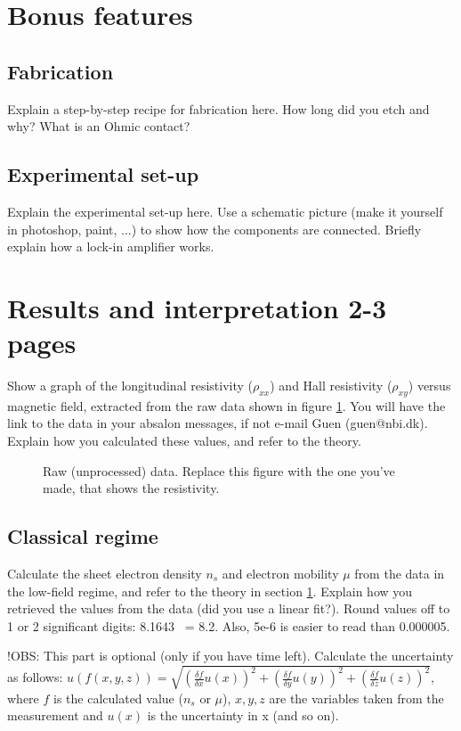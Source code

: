 \documentclass[a4paper]{article}
\begin{document}
      \section{Bonus features}
      \label{sec:bonus}
      \subsection{Fabrication}
      Explain a step-by-step recipe for fabrication here. How long did you etch and why? What is an Ohmic contact?
      \subsection{Experimental set-up}
      Explain the experimental set-up here. Use a schematic picture (make it yourself in photoshop, paint, ...) to show how the components are connected. Briefly explain how a lock-in amplifier works.
      
      \newpage
      \section{Results and interpretation 2-3 pages}
      Show a graph of the longitudinal resistivity ($\rho_{xx}$) and Hall resistivity ($\rho_{xy}$) versus magnetic field, extracted from the raw data shown in figure \ref{fig:data}. You will have the link to the data in your absalon messages, if not e-mail Guen (guen@nbi.dk). Explain how you calculated these values, and refer to the theory.
      
      \begin{figure}
      \centering
      \caption{\label{fig:data}Raw (unprocessed) data. Replace this figure with the one you've made, that shows the resistivity.}
      \end{figure}
      
      \subsection{Classical regime}
      Calculate the sheet electron density $n_{s}$ and electron mobility $\mu$ from the data in the low-field regime, and refer to the theory in section \ref{sec:bonus}. Explain how you retrieved the values from the data (did you use a linear fit?).
      Round values off to 1 or 2 significant digits: 8.1643 ~= 8.2. Also, 5e-6 is easier to read than 0.000005.
      
      !OBS: This part is optional (only if you have time left).
      Calculate the uncertainty as follows: \newline $u(f(x, y, z)) = \sqrt{(\frac{\delta f}{\delta{x}} u(x))^{2} + (\frac{\delta f}{\delta{y}} u(y))^{2} + (\frac{\delta f}{\delta{z}} u(z))^{2}}$, where $f$ is the calculated value ($n_{s}$ or $\mu$), $x, y, z$ are the variables taken from the measurement and $u(x)$ is the uncertainty in x (and so on).
      
\end{document}
